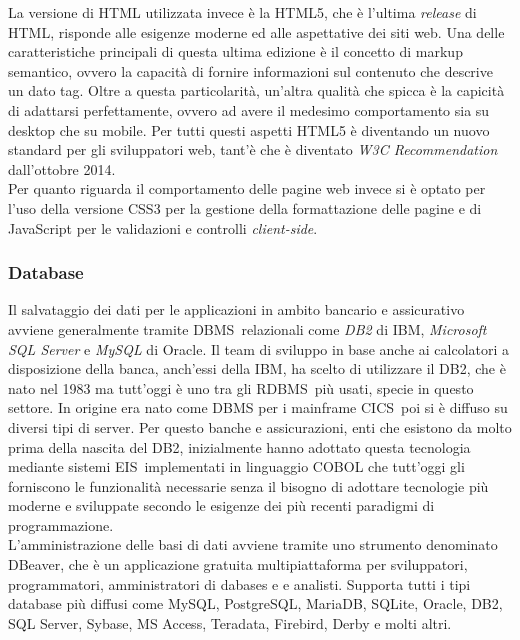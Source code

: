 	La versione di HTML utilizzata invece è la HTML5, che è l'ultima \textit{release} di HTML, risponde alle esigenze moderne ed alle aspettative dei siti web. Una delle caratteristiche principali di questa ultima edizione è il concetto di markup semantico, ovvero la capacità di fornire informazioni sul contenuto che descrive un dato tag. Oltre a questa particolarità, un'altra qualità che spicca è la capicità di adattarsi perfettamente, ovvero ad avere il medesimo comportamento sia su desktop che su mobile. Per tutti questi aspetti HTML5 è diventando un nuovo standard per gli sviluppatori web, tant'è che è diventato \textit{W3C Recommendation} dall'ottobre 2014.\\

	Per quanto riguarda il comportamento delle pagine web invece si è optato per l'uso della versione CSS3 per la gestione della formattazione delle pagine e di JavaScript per le validazioni e controlli \textit{client-side}.
		
	\subsubsection{Database}
	Il salvataggio dei dati per le applicazioni in ambito bancario e assicurativo avviene generalmente tramite DBMS\glossario\ relazionali come \textit{DB2} di IBM, \textit{Microsoft SQL Server} e \textit{MySQL} di Oracle. Il team di sviluppo in base anche ai calcolatori a disposizione della banca, anch'essi della IBM, ha scelto di utilizzare il DB2, che è nato nel 1983 ma tutt'oggi è uno tra gli RDBMS\glossario\ più usati, specie in questo settore. In origine era nato come DBMS per i mainframe CICS\glossario\, poi si è diffuso su diversi tipi di server. Per questo banche e assicurazioni, enti che esistono da molto prima della nascita del DB2, inizialmente hanno adottato questa tecnologia mediante sistemi EIS\glossario\ implementati in linguaggio COBOL che tutt'oggi gli forniscono le funzionalità necessarie senza il bisogno di adottare tecnologie più moderne e sviluppate secondo le esigenze dei più recenti paradigmi di programmazione.\\
	
	L'amministrazione delle basi di dati avviene tramite uno strumento denominato DBeaver, che è un applicazione gratuita multipiattaforma per sviluppatori, programmatori, amministratori di dabases e e analisti. Supporta tutti i tipi database più diffusi come MySQL, PostgreSQL, MariaDB, SQLite, Oracle, DB2, SQL Server, Sybase, MS Access, Teradata, Firebird, Derby e molti altri.

